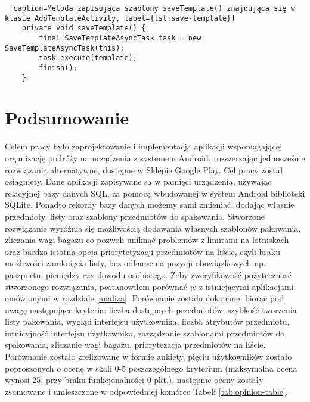\documentclass[a4paper,12pt]{article}
\begin{document}
\begin{lstlisting} [caption=Metoda zapisująca szablony saveTemplate() znajdująca się w klasie AddTemplateActivity, label={lst:save-template}]
    private void saveTemplate() {
        final SaveTemplateAsyncTask task = new SaveTemplateAsyncTask(this);
        task.execute(template);
        finish();
    }
\end{lstlisting}

\newpage
\section{Podsumowanie}

Celem pracy było zaprojektowanie i implementacja aplikacji wspomagającej organizację podróży na urządzenia z systemem Android, rozszerzając jednocześnie rozwiązania alternatywne, dostępne w Sklepie Google Play. Cel pracy został osiągnięty. Dane aplikacji zapisywane są w pamięci urządzenia, używając relacyjnej bazy danych SQL, za pomocą wbudowanej w system Android biblioteki SQLite. Ponadto rekordy bazy danych możemy sami zmieniać, dodając własnie przedmioty, listy oraz szablony przedmiotów do spakowania. Stworzone rozwiązanie wyróżnia się możliwością dodawania własnych szablonów pakowania, zliczania wagi bagażu co pozwoli uniknąć problemów z limitami na lotniskach oraz bardzo istotna opcja priorytetyzacji przedmiotów na liście, czyli braku możliwości zamknięcia listy, bez odhaczenia pozycji obowiązkowych np. paszportu, pieniędzy czy dowodu osobistego.
Żeby zweryfikowość pożyteczność stworzonego rozwiązania, postanowiłem porównać je z istniejącymi aplikacjami omówionymi w rozdziale \ref{analiza}. Porównanie zostało dokonane, biorąc pod uwagę następujące kryteria: liczba dostępnych przedmiotów, szybkość tworzenia listy pakowania,  wygląd interfejsu użytkownika, liczba atrybutów przedmiotu, intuicyjność interfejsu użytkownika, zarządzanie szablonami przedmiotów do spakowania, zliczanie wagi bagażu, priorytezacja przedmiotów na liście. Porównanie zostało zrelizowane w formie ankiety, pięciu użytkowników zostało poproszonych o ocenę w skali 0-5 poszczególnego kryterium (maksymalna ocena wynosi 25, przy braku funkcjonalności 0 pkt.), następnie oceny zostały zsumowane i umieszczone w odpowiedniej komórce Tabeli \ref{tab:opinion-table}.
\end{document}
